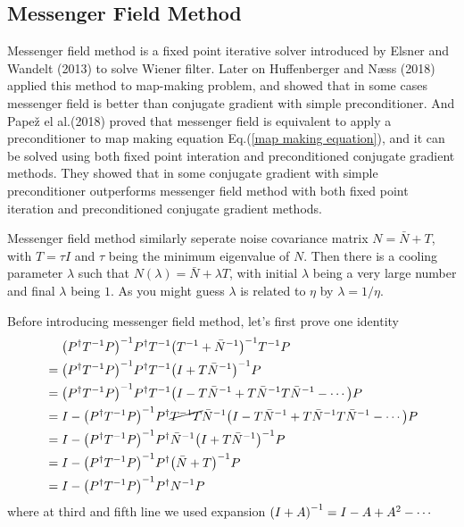 \documentclass[11pt, letterpaper]{article}
\newcommand{\inv}[1]{#1^{-1}}
\newcommand{\Pdagger}{P^{\dagger}}
\newcommand{\Nbar}{\bar{N}}
\newcommand{\PPinv}[1]{\inv{\qty(\Pdagger #1 P)}}
\begin{document}
\subsection{Messenger Field Method}
Messenger field method is a fixed point iterative solver introduced by
Elsner and Wandelt (2013) \cite{2013A&A...549A.111E} to solve Wiener filter.
Later on Huffenberger and N{\ae}ss (2018) \cite{Huffenberger_2018} applied this
method to map-making problem, and showed that in some cases messenger field is
better than conjugate gradient with simple preconditioner.
And Pape\v{z} el al.(2018) \cite{2018A&A...620A..59P} proved that messenger
field is equivalent to apply a preconditioner to map making equation
Eq.(\ref{map making equation}), and it can be solved using both fixed point
interation and preconditioned conjugate gradient methods.
They showed that in some conjugate gradient with simple preconditioner
outperforms messenger field method with both fixed point iteration and
preconditioned conjugate gradient methods.

Messenger field method similarly seperate noise covariance matrix
$N = \Nbar + T$, with $T = \tau I $ and $\tau$ being the minimum eigenvalue of
$N$.
Then there is a cooling parameter $\lambda$ such that 
$N(\lambda) = \Nbar + \lambda T$, with initial $\lambda$ being a very large
number and final $\lambda$ being $1$.
As you might guess $\lambda$ is related to $\eta$ by $\lambda = 1/\eta$.

Before introducing messenger field method, let's first prove one identity
\begin{align}
\begin{aligned}[b]
&\mathrel{\phantom{=}}
\PPinv{\inv{T}} \Pdagger \inv{T} \inv{\qty(\inv{T} + \inv{\Nbar})} \inv{T} P
\\
&= \PPinv{\inv{T}} \Pdagger \inv{T} \inv{\qty(I + T\inv{\Nbar})}  P
\\
&= \PPinv{\inv{T}} \Pdagger \inv{T}
    \qty(I - T\inv{\Nbar}+ T\inv{\Nbar}T\inv{\Nbar} - \cdots) P
\\
&= I - \PPinv{\inv{T}} \Pdagger \cancel{\inv{T}T} \inv{\Nbar} 
    \qty(I - T\inv{\Nbar} + T\inv{\Nbar}T\inv{\Nbar} - \cdots)P
\\
&= I - \PPinv{\inv{T}} \Pdagger \inv{\Nbar} \inv{\qty(I + T\inv{\Nbar})} P
\\
&= I - \PPinv{\inv{T}} \Pdagger \inv{\qty(\Nbar + T)} P
\\
&= I - \PPinv{\inv{T}} \Pdagger \inv{N} P \label{MF identity}
\end{aligned}
\end{align}
where at third and fifth line we used expansion
$\inv{\qty(I + A)} = I - A + A^2 - \cdots $
\end{document}
